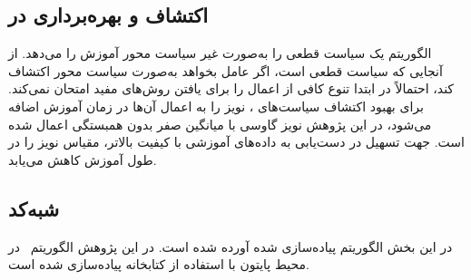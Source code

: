          \subsection{اکتشاف و بهره‌برداری در 
 }
 الگوریتم
  یک سیاست قطعی را به‌صورت غیر سیاست محور آموزش را می‌دهد. از آنجایی که سیاست قطعی است، اگر عامل بخواهد به‌صورت سیاست محور اکتشاف کند، احتمالاً در ابتدا تنوع کافی از اعمال را برای یافتن روش‌های مفید امتحان نمی‌کند. برای بهبود اکتشاف سیاست‌های ، نویز را به اعمال آن‌ها در زمان آموزش اضافه می‌شود، در این پژوهش نویز گاوسی با میانگین صفر بدون همبستگی اعمال شده است. جهت تسهیل در دست‌یابی به داده‌های آموزشی با کیفیت بالاتر، مقیاس نویز را در طول آموزش کاهش می‌یابد.
  
  \subsection{شبه‌کد 
  }
   در این بخش الگوریتم
  پیاده‌سازی شده آورده شده است. در این پژوهش الگوریتم~ در محیط پایتون با استفاده از کتابخانه
   \cite{paszke2017automatic}
  پیاده‌سازی شده ‌است.
         
